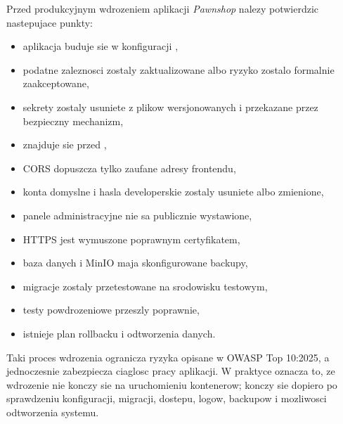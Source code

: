 \documentclass[12pt,a4paper]{article}
\begin{document}
Przed produkcyjnym wdrozeniem aplikacji \textit{Pawnshop} nalezy potwierdzic nastepujace punkty:

\begin{itemize}
    \item aplikacja buduje sie w konfiguracji ,
    \item podatne zaleznosci zostaly zaktualizowane albo ryzyko zostalo formalnie zaakceptowane,
    \item sekrety zostaly usuniete z plikow wersjonowanych i przekazane przez bezpieczny mechanizm,
    \item {} znajduje sie przed ,
    \item CORS dopuszcza tylko zaufane adresy frontendu,
    \item konta domyslne i hasla developerskie zostaly usuniete albo zmienione,
    \item panele administracyjne nie sa publicznie wystawione,
    \item HTTPS jest wymuszone poprawnym certyfikatem,
    \item baza danych i MinIO maja skonfigurowane backupy,
    \item migracje zostaly przetestowane na srodowisku testowym,
    \item testy powdrozeniowe przeszly poprawnie,
    \item istnieje plan rollbacku i odtworzenia danych.
\end{itemize}

Taki proces wdrozenia ogranicza ryzyka opisane w OWASP Top 10:2025, a jednoczesnie zabezpiecza ciaglosc pracy aplikacji. W praktyce oznacza to, ze wdrozenie nie konczy sie na uruchomieniu kontenerow; konczy sie dopiero po sprawdzeniu konfiguracji, migracji, dostepu, logow, backupow i mozliwosci odtworzenia systemu.
\end{document}
